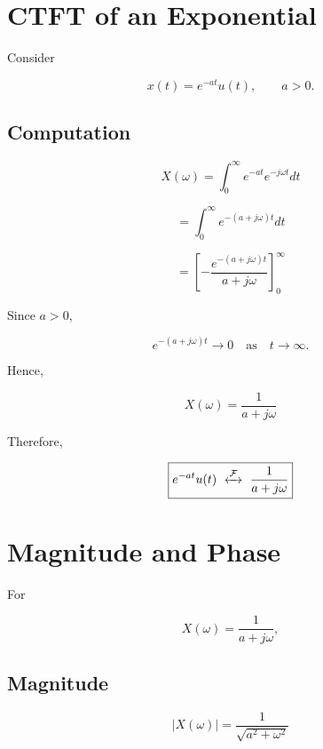 
\section{CTFT of an Exponential}

Consider

\[
x(t)=e^{-at}u(t),\qquad a>0.
\]


\subsection{Computation}

\[
X(\omega)=
\int_0^\infty e^{-at}e^{-j\omega t}dt
\]

\[
=
\int_0^\infty e^{-(a+j\omega)t}dt
\]

\[
=
\left[
-\frac{e^{-(a+j\omega)t}}{a+j\omega}
\right]_0^\infty
\]

Since \(a>0\),

\[
e^{-(a+j\omega)t}\to0
\quad \text{as}\quad t\to\infty.
\]

Hence,

\[
\boxed{
X(\omega)=\frac{1}{a+j\omega}
}
\]

Therefore,

\[
\boxed{
e^{-at}u(t)
\ \xleftrightarrow{\mathcal{F}}\
\frac{1}{a+j\omega}
}
\]


\section{Magnitude and Phase}

For

\[
X(\omega)=\frac{1}{a+j\omega},
\]


\subsection{Magnitude}

\[
\boxed{
|X(\omega)|=
\frac{1}{\sqrt{a^2+\omega^2}}
}
\]


